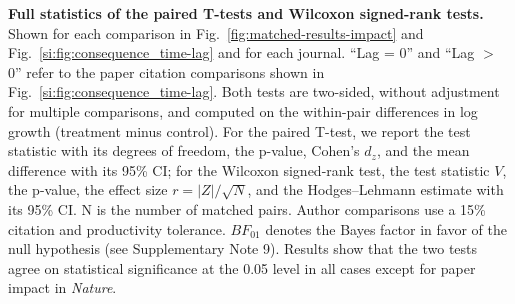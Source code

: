 \documentclass[12pt]{article} %
\begin{document}
\begin{landscape}
\begin{table}[ht]
\small
\centering
\caption{
\textbf{Full statistics of the paired T-tests and Wilcoxon signed-rank tests.}
Shown for each comparison in Fig.~\ref*{fig:matched-results-impact} and Fig.~\ref{si:fig:consequence_time-lag} and for each journal.
``Lag = 0'' and ``Lag $>$ 0'' refer to the paper citation comparisons shown in Fig.~\ref{si:fig:consequence_time-lag}.
Both tests are two-sided, without adjustment for multiple comparisons, and computed on the within-pair differences in log growth (treatment minus control). For the paired T-test, we report the test statistic with its degrees of freedom, the p-value, Cohen's $d_z$, and the mean difference with its 95\% CI; for the Wilcoxon signed-rank test, the test statistic $V$, the p-value, the effect size $r = |Z|/\sqrt{N}$, and the Hodges--Lehmann estimate with its 95\% CI. N is the number of matched pairs. Author comparisons use a 15\% citation and productivity tolerance. $BF_{01}$ denotes the Bayes factor in favor of the null hypothesis (see Supplementary Note 9).
Results show that the two tests agree on statistical significance at the 0.05 level in all cases except for paper impact in \textit{Nature}.
}
\label{si:tab:wilcoxon}
%
\end{table}
\end{landscape}
\end{document}
